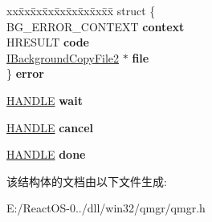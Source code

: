 \begin{DoxyCompactItemize}
\begin{tabbing}
\end{tabbing}\item 
\mbox{\label{struct_background_copy_job_impl_a0a057ccaac66d6c42bec81f534ba3999}} 
\begin{tabbing}
xx\=xx\=xx\=xx\=xx\=xx\=xx\=xx\=xx\=\kill
struct \{\\
\>BG\_ERROR\_CONTEXT {\bfseries context}\\
\>HRESULT {\bfseries code}\\
\>\hyperlink{interface_i_background_copy_file2}{IBackgroundCopyFile2} $\ast$ {\bfseries file}\\
\} {\bfseries error}\\

\end{tabbing}\item 
\mbox{\label{struct_background_copy_job_impl_adc2cd712a06224400839a16f79b6b14a}} 
\hyperlink{interfacevoid}{H\+A\+N\+D\+LE} {\bfseries wait}
\item 
\mbox{\label{struct_background_copy_job_impl_a948f0efb22684f2669a83b4ee6334bfa}} 
\hyperlink{interfacevoid}{H\+A\+N\+D\+LE} {\bfseries cancel}
\item 
\mbox{\label{struct_background_copy_job_impl_a64b05085f58b48e71db2364b8019530d}} 
\hyperlink{interfacevoid}{H\+A\+N\+D\+LE} {\bfseries done}
\end{DoxyCompactItemize}


该结构体的文档由以下文件生成\+:\begin{DoxyCompactItemize}
\item 
E\+:/\+React\+O\+S-\/0../dll/win32/qmgr/qmgr.\+h\end{DoxyCompactItemize}
